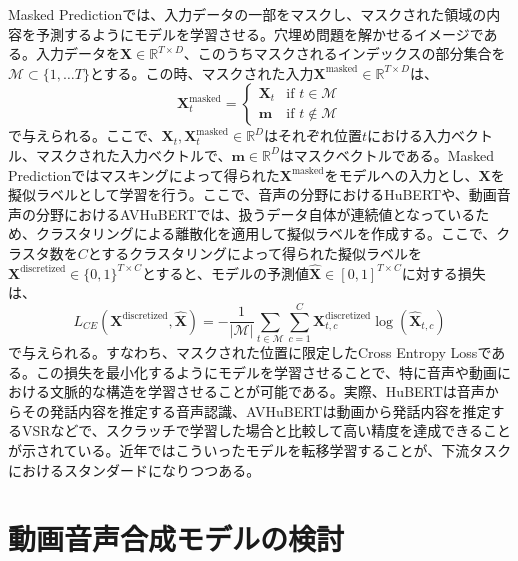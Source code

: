 \documentclass[12pt]{jarticle}
\numberwithin{equation}{section}    %
\numberwithin{figure}{section}      %
\numberwithin{table}{section}      %
\begin{document}
Masked Predictionでは、入力データの一部をマスクし、マスクされた領域の内容を予測するようにモデルを学習させる。穴埋め問題を解かせるイメージである。入力データを$\bm{X} \in \mathbb{R}^{T \times D}$、このうちマスクされるインデックスの部分集合を$\mathcal{M} \subset \{ 1, \ldots T \}$とする。この時、マスクされた入力$\bm{X}^{\text{masked}} \in \mathbb{R}^{T \times D}$は、
\begin{equation}
    \bm{X}^{\text{masked}}_{t} =
    \begin{cases}
        \bm{X}_{t} & \text{if $t \in \mathcal{M}$}    \\
        \bm{m}     & \text{if $t \notin \mathcal{M}$}
    \end{cases}
\end{equation}
で与えられる。ここで、$\bm{X}_{t}, \bm{X}^{\text{masked}}_{t} \in \mathbb{R}^{D}$はそれぞれ位置$t$における入力ベクトル、マスクされた入力ベクトルで、$\bm{m} \in \mathbb{R}^{D}$はマスクベクトルである。Masked Predictionではマスキングによって得られた$\bm{X}^{\text{masked}}$をモデルへの入力とし、$\bm{X}$を擬似ラベルとして学習を行う。ここで、音声の分野におけるHuBERT\cite{hsu2021hubert}や、動画音声の分野におけるAVHuBERT\cite{shi2022learning}では、扱うデータ自体が連続値となっているため、クラスタリングによる離散化を適用して擬似ラベルを作成する。ここで、クラスタ数を$C$とするクラスタリングによって得られた擬似ラベルを$\bm{X}^{\text{discretized}} \in \{0, 1\}^{T \times C}$とすると、モデルの予測値$\hat{\bm{X}} \in [0, 1]^{T \times C}$に対する損失は、
\begin{equation}
    L_{CE}(\bm{X}^{\text{discretized}}, \hat{\bm{X}}) =
    - \frac{1}{|\mathcal{M}|} \sum_{t \in \mathcal{M}} \sum_{c = 1}^{C} \bm{X}^{\text{discretized}}_{t, c} \log (\hat{\bm{X}}_{t, c})
\end{equation}
で与えられる。すなわち、マスクされた位置に限定したCross Entropy Lossである。この損失を最小化するようにモデルを学習させることで、特に音声や動画における文脈的な構造を学習させることが可能である。実際、HuBERTは音声からその発話内容を推定する音声認識、AVHuBERTは動画から発話内容を推定するVSRなどで、スクラッチで学習した場合と比較して高い精度を達成できることが示されている。近年ではこういったモデルを転移学習することが、下流タスクにおけるスタンダードになりつつある。

\clearpage

\section{動画音声合成モデルの検討}
\end{document}
